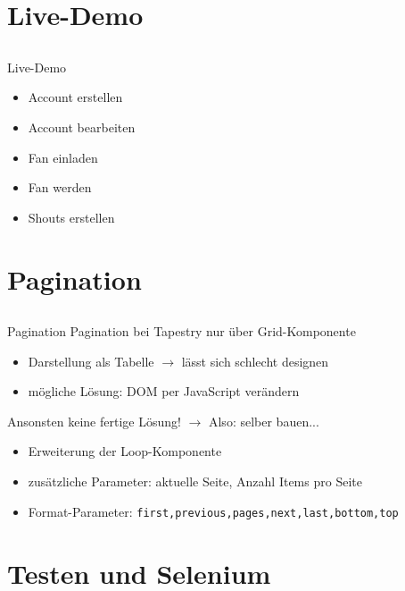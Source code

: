 \section{Live-Demo}

\subsection*{}
\begin{frame}{Live-Demo}
\begin{itemize}
\item Account erstellen
\item Account bearbeiten
\item Fan einladen
\item Fan werden
\item Shouts erstellen
\end{itemize}
\end{frame}

\section{Pagination}
\subsection*{}
\begin{frame}{Pagination}
Pagination bei Tapestry nur über Grid-Komponente \\
\begin{itemize}
\item Darstellung als Tabelle $\rightarrow$ lässt sich schlecht designen
\item mögliche Lösung: DOM per JavaScript verändern 
\end{itemize}
\pause
Ansonsten keine fertige Lösung! $\rightarrow$ Also: selber bauen... \\
\pause
\begin{itemize}
\item Erweiterung der Loop-Komponente
\item zusätzliche Parameter: aktuelle Seite, Anzahl Items pro Seite
\item Format-Parameter: \texttt{first,previous,pages,next,last,bottom,top}
\end{itemize}
\end{frame}

\section{Testen und Selenium}
